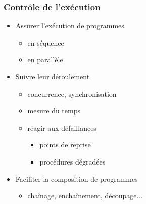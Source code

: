 \begin{frame}
 \frametitle{Contrôle de l'exécution}
 \begin{itemize}
 \item Assurer l'exécution de programmes
 \begin{itemize}
 \item en séquence
 \item en parallèle
 \end{itemize}
 \item Suivre leur déroulement
 \begin{itemize}
 \item concurrence, synchronisation
 \item mesure du temps
 \item réagir aux défaillances
 \begin{itemize}
 \item points de reprise
 \item procédures dégradées
 \end{itemize}
 \end{itemize}
 \item Faciliter la composition de programmes
 \begin{itemize}
 \item chaînage, enchaînement, découpage...
 \end{itemize}
 \end{itemize}
\end{frame}


